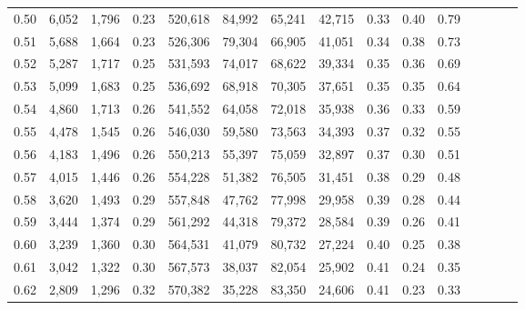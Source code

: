 \begin{tabular}{rrrcrrrrrrrrrrr}
0.50 &   6,052 &  1,796 &                                       0.23 &  520,618 &   84,992 &   65,241 &   42,715 &  0.33 &  0.40 &                         0.79 \\
0.51 &   5,688 &  1,664 &                                       0.23 &  526,306 &   79,304 &   66,905 &   41,051 &  0.34 &  0.38 &                         0.73 \\
0.52 &   5,287 &  1,717 &                                       0.25 &  531,593 &   74,017 &   68,622 &   39,334 &  0.35 &  0.36 &                         0.69 \\
0.53 &   5,099 &  1,683 &                                       0.25 &  536,692 &   68,918 &   70,305 &   37,651 &  0.35 &  0.35 &                         0.64 \\
0.54 &   4,860 &  1,713 &                                       0.26 &  541,552 &   64,058 &   72,018 &   35,938 &  0.36 &  0.33 &                         0.59 \\
0.55 &   4,478 &  1,545 &                                       0.26 &  546,030 &   59,580 &   73,563 &   34,393 &  0.37 &  0.32 &                         0.55 \\
0.56 &   4,183 &  1,496 &                                       0.26 &  550,213 &   55,397 &   75,059 &   32,897 &  0.37 &  0.30 &                         0.51 \\
0.57 &   4,015 &  1,446 &                                       0.26 &  554,228 &   51,382 &   76,505 &   31,451 &  0.38 &  0.29 &                         0.48 \\
0.58 &   3,620 &  1,493 &                                       0.29 &  557,848 &   47,762 &   77,998 &   29,958 &  0.39 &  0.28 &                         0.44 \\
0.59 &   3,444 &  1,374 &                                       0.29 &  561,292 &   44,318 &   79,372 &   28,584 &  0.39 &  0.26 &                         0.41 \\
0.60 &   3,239 &  1,360 &                                       0.30 &  564,531 &   41,079 &   80,732 &   27,224 &  0.40 &  0.25 &                         0.38 \\
0.61 &   3,042 &  1,322 &                                       0.30 &  567,573 &   38,037 &   82,054 &   25,902 &  0.41 &  0.24 &                         0.35 \\
0.62 &   2,809 &  1,296 &                                       0.32 &  570,382 &   35,228 &   83,350 &   24,606 &  0.41 &  0.23 &                         0.33 \\

\end{tabular}
